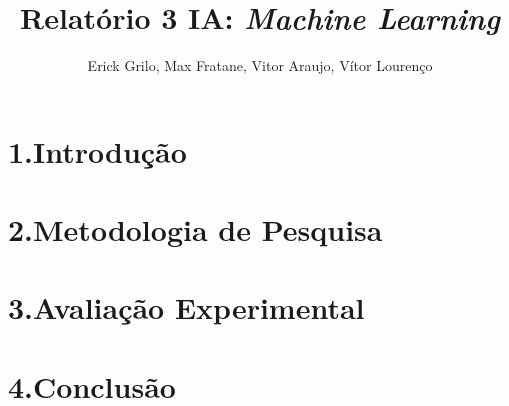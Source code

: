\documentclass[12pt]{article}
\title{Relatório 3 IA: \textit{Machine Learning}}
\author{Erick Grilo\inst{1}, Max Fratane\inst{1}, Vitor Araujo\inst{1}, Vítor Lourenço\inst{1}}
\begin{document}
 

\maketitle
\begin{resumo}
\end{resumo}


\section{1.\quad Introdução}


\section{2.\quad Metodologia de Pesquisa}


\section{3.\quad Avaliação Experimental}


\section{4.\quad Conclusão}




\end{document}

